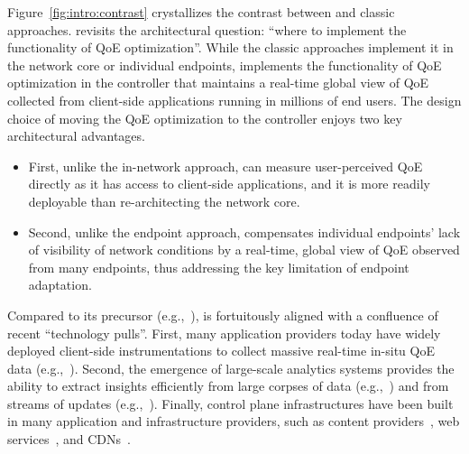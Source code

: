 Figure~\ref{fig:intro:contrast} crystallizes the contrast between
\ddn and classic approaches.
\ddn revisits the architectural question: ``where to implement the functionality of QoE 
optimization''.
While the classic approaches implement it in the network core or individual endpoints, 
\ddn implements the functionality of QoE optimization in the controller 
that maintains a real-time global view of QoE collected from
client-side applications running in millions of end users.
The design choice of moving the QoE optimization to the \ddn controller enjoys
two key architectural advantages.
\begin{itemize}
\item First, unlike the in-network approach, 
\ddn can measure user-perceived QoE directly as it has access to client-side applications,
and it is more readily deployable than 
re-architecting the network core.
\item Second, unlike the endpoint approach, 
\ddn compensates individual endpoints' lack of 
visibility of network conditions by a real-time, global view of QoE 
observed from many endpoints, thus addressing the key limitation of 
endpoint adaptation. 
\end{itemize}

\vspace{0.2cm}
Compared to its precursor (e.g.,~\cite{spand,seshan1997spand}),
\ddn is fortuitously aligned with a confluence of recent  ``technology pulls''. 
First, many application providers today have widely deployed client-side 
instrumentations to collect massive real-time in-situ QoE data  (e.g.,~\cite{sigcomm11,via,imc12akamai,artizanetworks}). 
Second, the emergence of large-scale analytics systems provides the ability 
to extract insights efficiently from large corpses 
of data (e.g.,~\cite{spark}) and from streams of updates 
(e.g.,~\cite{zaharia2013discretized}). 
Finally, control plane infrastructures have been built in many 
application and infrastructure providers, such as 
content providers~\cite{c3}, web services~\cite{footprint},
and CDNs~\cite{chen2015end,mukerjee2015practical}.

